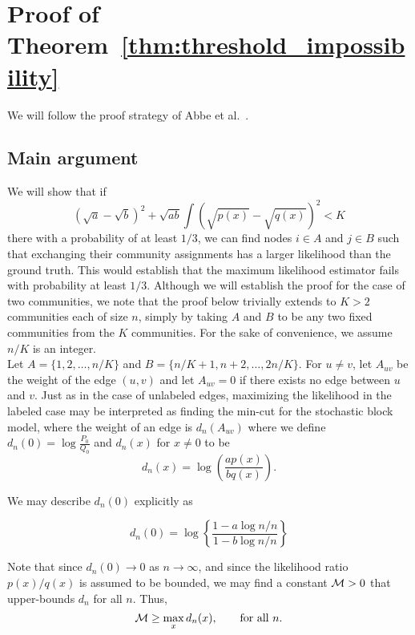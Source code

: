 \section{Proof of Theorem~\ref{thm:threshold_impossibility}}
\label{sec:threshold_proof}

We will follow the proof strategy of Abbe et al.~\cite{abbe2014exact}.

\subsection{Main argument}

We will show that if 
\[
 (\sqrt{a} - \sqrt{b})^2 + \sqrt{ab} \int (\sqrt{p(x)} - \sqrt{q(x)})^2 < K
\]
there with a probability of at least $1/3$, we can find nodes $i \in A$ and $j \in B$ such that exchanging their community assignments has a larger likelihood than the ground truth. This would establish that the maximum likelihood estimator fails with probability at least $1/3$. Although we will establish the proof for the case of two communities, we note that the proof below trivially extends to $K > 2$ communities each of size $n$, simply by taking $A$ and $B$ to be any two fixed communities from the $K$ communities. For the sake of convenience, we assume $n/K$ is an integer.  \\


Let $A = \{1, 2, \dots, n/K\}$ and $B = \{n/K+1, n+2, \dots, 2n/K\}$. For $u\neq v$, let $A_{uv}$ be the weight of the edge $(u,v)$ and let $A_{uv} = 0$ if there exists no edge between $u$ and $v$. Just as in the case of unlabeled edges, maximizing the likelihood in the labeled case may be interpreted as finding the min-cut for the stochastic block model, where the weight of an edge is $d_n(A_{uv})$ where we define $d_n(0) = \log \frac{P_0}{Q_0}$ and $d_n(x)$ for $x \neq 0$ to be
\[
d_n(x) = \log \left( \frac{a p(x)}{b q(x)} \right).
\]

 We may describe $d_n(0)$ explicitly as

\begin{equation}
\label{EqnDefnDn}
d_n(0) = \log \left\{ \frac{1 - a \log n/n}{1 - b \log n/n}\right\}
\end{equation}

Note that since $d_n(0) \to 0$ as $n \to \infty$, and since the likelihood ratio $p(x)/q(x)$ is assumed to be bounded, we may find a constant ${\mathcal{M}} > 0$ that upper-bounds $d_n$ for all $n$. Thus, 
\begin{equation*}
{\mathcal{M}} \geq \max_x d_n(x), \qquad \text{for all } n.
\end{equation*}

